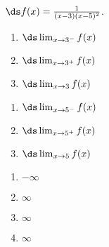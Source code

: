 {$\ds f(x) = \frac{1}{(x-3)(x-5)^2}$.

\begin{minipage}[t]{.5\linewidth}
\begin{enumerate}
\item		$\ds \lim_{x\to 3^-} f(x)$
\item		$\ds \lim_{x\to 3^+} f(x)$
\item		$\ds \lim_{x\to 3} f(x)$
\end{enumerate}
\end{minipage}
\begin{minipage}[t]{.5\linewidth}
\begin{enumerate}\addtocounter{enumii}{3}
\item		$\ds \lim_{x\to 5^-} f(x)$
\item		$\ds \lim_{x\to 5^+} f(x)$
\item		$\ds \lim_{x\to 5} f(x)$
\end{enumerate}
\end{minipage}

}
{\begin{enumerate}
\item	$-\infty$
\item	$\infty$
\item	$\infty$
\item	$\infty$
\end{enumerate}
}
